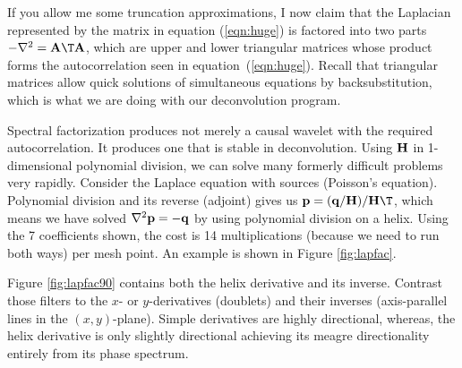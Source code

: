 If you allow me some truncation approximations,
I now claim that the Laplacian represented by the
matrix in equation (\ref{eqn:huge})
is factored into two parts
$-\nabla^2 =\bold A\T\bold A$,
which are upper and lower triangular matrices
whose product forms the autocorrelation seen in equation~(\ref{eqn:huge}).
Recall that triangular matrices
allow quick solutions of simultaneous equations by backsubstitution,
which is what we are doing with our
deconvolution program.
\par
Spectral factorization produces not merely a causal wavelet
with the required autocorrelation.
It produces one that is stable in deconvolution.
Using $\bold H$ in 1-dimensional polynomial division,
we can solve many formerly difficult problems very rapidly.
Consider the Laplace equation with sources (Poisson's equation).
Polynomial division and its reverse (adjoint) gives us
$\bold p =(\bold q/\bold H)/\bold H\T$,
which means we have solved
$\nabla^2 \bold p = -\bold q$
by using polynomial division on a helix.
Using the 7 coefficients shown,
the cost is 14 multiplications
(because we need to run both ways) per mesh point.
An example is shown in Figure \ref{fig:lapfac}.
\par
Figure \ref{fig:lapfac90} contains both the helix derivative and its inverse.
Contrast those filters to the $x$- or $y$-derivatives (doublets) and their inverses
(axis-parallel lines in the $(x,y)$-plane).
Simple derivatives are highly directional,
whereas, the helix derivative is only slightly directional
achieving its meagre directionality entirely from its phase spectrum.
